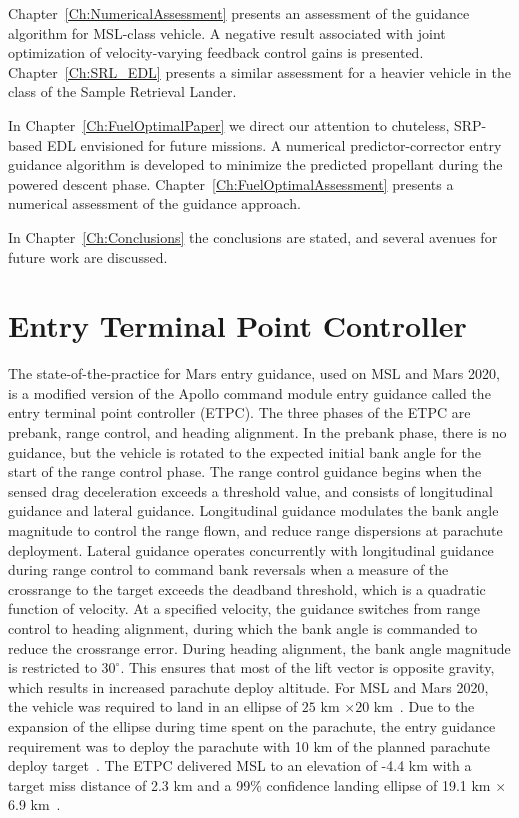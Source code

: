 Chapter~\ref{Ch:NumericalAssessment} presents an assessment of the guidance algorithm for MSL-class vehicle.  A negative result associated with joint optimization of velocity-varying feedback control gains is presented. Chapter~\ref{Ch:SRL_EDL} presents a similar assessment for a heavier vehicle in the class of the Sample Retrieval Lander.

In Chapter~\ref{Ch:FuelOptimalPaper} we direct our attention to chuteless, SRP-based EDL envisioned for future missions. A numerical predictor-corrector entry guidance algorithm is developed to minimize the predicted propellant during the powered descent phase. Chapter~\ref{Ch:FuelOptimalAssessment} presents a numerical assessment of the guidance approach. 

In Chapter~\ref{Ch:Conclusions} the conclusions are stated, and several avenues for future work are discussed.

\section{Entry Terminal Point Controller}\label{Sec:ETPC}
The state-of-the-practice for Mars entry guidance, used on MSL and Mars 2020, is a modified version of the Apollo command module entry guidance \cite{MSL_EDL2} called the entry terminal point controller (ETPC). 
The three phases of the ETPC are prebank, range control, and heading alignment. In the prebank phase, there is no guidance, but the vehicle is rotated to the expected initial bank angle for the start of the range control phase.
The range control guidance begins when the sensed drag deceleration exceeds a threshold value, and consists of longitudinal guidance and lateral guidance. Longitudinal guidance modulates the bank angle magnitude to control the range flown, and reduce range dispersions at parachute deployment. Lateral guidance operates concurrently with longitudinal guidance during range control to command bank reversals when a measure of the crossrange to the target exceeds the deadband threshold, which is a quadratic function of velocity. At a specified velocity, the guidance switches from range control to heading alignment, during which the bank angle is commanded to reduce the crossrange error. During heading alignment, the bank angle magnitude is restricted to $30^{\circ}$. This ensures that most of the lift vector is opposite gravity, which results in increased parachute deploy altitude.
For MSL and Mars 2020, the vehicle was required to land in an ellipse of $25$ km $\times 20$ km~\cite{MSL_EDL2,M2020_EDL}. Due to the expansion of the ellipse during time spent on the parachute, the entry guidance requirement was to deploy the parachute with 10 km of the planned parachute deploy target~\cite{MSL_EDL2}. The ETPC delivered MSL to an elevation of -4.4 km with a target miss distance of 2.3 km and a 99\% confidence landing ellipse of 19.1 km $\times$ 6.9 km~\cite{MSL_EDL2}.

